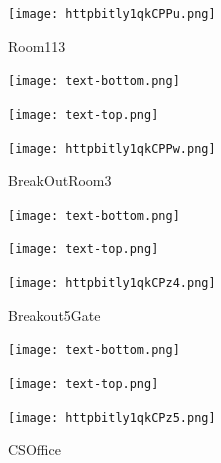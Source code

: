 \documentclass[letterpaper]{article}
\begin{document}
 \begingroup 
 \centerline{\texttt{[image: httpbitly1qkCPPu.png]}} 
 \endgroup 
 \vspace*{\fill} 

 \hfill{\small Room113} 

  \vspace{0.7in} 
 
 \centerline{\texttt{[image: text-bottom.png]}} 
 
 \pagebreak 
{} 
 \vspace*{\fill} 
 
  \centerline{\texttt{[image: text-top.png]}} 
 
 \vspace{0.5in} 
 
 \begingroup 
 \centerline{\texttt{[image: httpbitly1qkCPPw.png]}} 
 \endgroup 
 \vspace*{\fill} 

 \hfill{\small BreakOutRoom3} 

  \vspace{0.7in} 
 
 \centerline{\texttt{[image: text-bottom.png]}} 
 
 \pagebreak 
{} 
 \vspace*{\fill} 
 
  \centerline{\texttt{[image: text-top.png]}} 
 
 \vspace{0.5in} 
 
 \begingroup 
 \centerline{\texttt{[image: httpbitly1qkCPz4.png]}} 
 \endgroup 
 \vspace*{\fill} 

 \hfill{\small Breakout5Gate} 

  \vspace{0.7in} 
 
 \centerline{\texttt{[image: text-bottom.png]}} 
 
 \pagebreak 
{} 
 \vspace*{\fill} 
 
  \centerline{\texttt{[image: text-top.png]}} 
 
 \vspace{0.5in} 
 
 \begingroup 
 \centerline{\texttt{[image: httpbitly1qkCPz5.png]}} 
 \endgroup 
 \vspace*{\fill} 

 \hfill{\small CSOffice} 

  \vspace{0.7in} 
 
\end{document}
